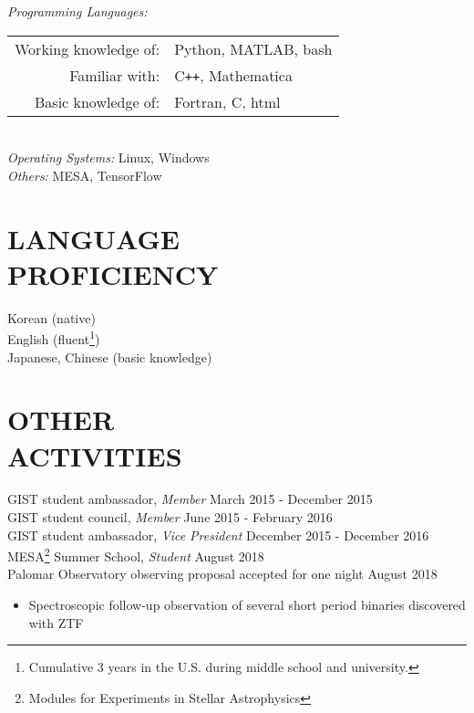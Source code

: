 \documentclass[margin, 10pt]{res} %
\begin{document}
\begin{resume}
{\sl Programming Languages:}\\%
\begin{tabular}{rl}
    Working knowledge of:& Python, MATLAB, bash\\
    Familiar with:& C\texttt{++}, Mathematica\\
     Basic knowledge of:& Fortran, C, html  \\
\end{tabular}\\
{\sl Operating Systems:} Linux, Windows \\
{\sl Others:} MESA, TensorFlow\\
 
\section{LANGUAGE \\ PROFICIENCY} 

Korean (native) \\
English (fluent\footnote{Cumulative 3 years in the U.S. during middle school and university.}) \\
Japanese, Chinese (basic knowledge) \\
 


\section{OTHER \\ ACTIVITIES} 

GIST student ambassador, {\sl Member} \hfill March 2015 - December 2015\\
GIST student council, {\sl Member} \hfill June 2015 - February 2016\\
GIST student ambassador, {\sl Vice President} \hfill December 2015 - December 2016 \\
MESA\footnote{Modules for Experiments in Stellar Astrophysics} Summer School, {\sl Student} \hfill August 2018 \\
Palomar Observatory observing proposal accepted for one night \hfill August 2018
\begin{itemize}
\item[] Spectroscopic follow-up observation of several short period binaries discovered with ZTF
\end{itemize}


\end{resume}
\end{document}

